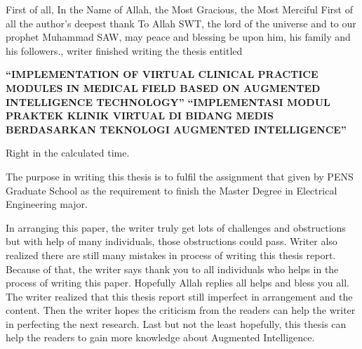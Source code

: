 \begin{preface}
    
First of all, In the Name of Allah, the Most Gracious, the Most Merciful First of all the author's deepest thank To Allah SWT, the lord of the universe and to our prophet Muhammad SAW, may peace and blessing be upon him, his family and his followers., writer finished writing the thesis entitled 

\textbf{“IMPLEMENTATION OF VIRTUAL CLINICAL PRACTICE MODULES
IN MEDICAL FIELD BASED ON AUGMENTED INTELLIGENCE TECHNOLOGY” }
\textbf{
“IMPLEMENTASI MODUL PRAKTEK KLINIK VIRTUAL
DI BIDANG MEDIS BERDASARKAN TEKNOLOGI AUGMENTED INTELLIGENCE”}

Right in the calculated time.

The purpose in writing this thesis is to fulfil the assignment that given by PENS Graduate School as the requirement to finish the Master Degree in Electrical Engineering major. 

In arranging this paper, the writer truly get lots of challenges and obstructions but with help of many individuals, those obstructions could pass. Writer also realized there are still many mistakes in process of writing this thesis report. Because of that, the writer says thank you to all individuals who helps in the process of writing this paper. Hopefully Allah replies all helps and bless you all. The writer realized that this thesis report still imperfect in arrangement and the content.  Then the writer hopes the criticism from the readers can help the writer in perfecting the next research. Last but not the least hopefully, this thesis can help the readers to gain more knowledge about Augmented Intelligence.


\end{preface}